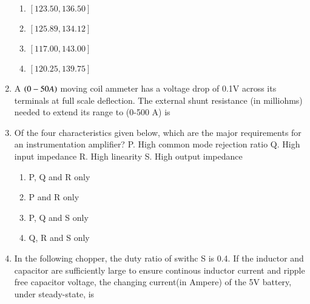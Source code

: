 \documentclass[journal,12pt,onecolumn]{IEEEtran}
\theoremstyle{remark}
\begin{document}
\begin{enumerate}
\begin{figure}[!ht]
\label{fig:my_label}
\end{figure}

    \begin{enumerate}
        \item $[123.50, 136.50]$
        \item $[125.89, 134.12]$
        \item $[117.00, 143.00]$
        \item $[120.25, 139.75]$
    \end{enumerate}


    \item A $\left(0 - 50A\right)$ moving coil ammeter has a voltage drop of 0.1V across its terminals at full scale deflection. The external shunt resistance (in  milliohms) needed to extend its range to (0-500 A) is \underline{\hspace{2cm}}

    \item Of the four characteristics given below, which are the major requirements for an instrumentation amplifier?
    P. High common mode rejection ratio
    Q. High input impedance
    R. High linearity
    S. High output impedance
    \begin{enumerate}
        \item P, Q and R only
        \item P and R only
        \item P, Q and S only
        \item Q, R and S only
    \end{enumerate}

    \item In the following chopper, the duty ratio of swithc S is 0.4. If the inductor and capacitor are sufficiently large to ensure continous inductor current and ripple free capacitor voltage, the changing current(in Ampere) of the 5V battery, under steady-state, is \underline{\hspace{2cm}}


\end{enumerate}
\end{document}
